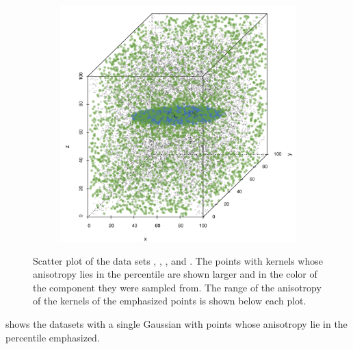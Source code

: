 \begin{figure}
\begin{subfigure}{0.23\textwidth}
					\caption{}
					\label{fig:discussion:anisotropy:baakman4}
				\end{subfigure}		
				\begin{subfigure}{0.23\textwidth}
					\centering
					\includegraphics[keepaspectratio=true, width=\textwidth, height=0.23\textheight]{discussion/img/baakman_5_60000_anisotropy.png}
					\caption{}
					\label{fig:discussion:anisotropy:baakman5}
				\end{subfigure}			
				\caption{Scatter plot of the data sets
					 \ferdosiOne, %
					 \baakmanOne, %
					 \baakmanFour, and %
					 \baakmanFive. %
					The points with kernels whose anisotropy lies in the  percentile are shown larger and in the color of the component they were sampled from. The range of the anisotropy of the kernels of the emphasized points is shown below each plot.}
				\label{fig:discussion:anisotropy:singleSphere}
			\end{figure}
			 shows the datasets with a single Gaussian with points whose anisotropy lie in the  percentile emphasized. 
